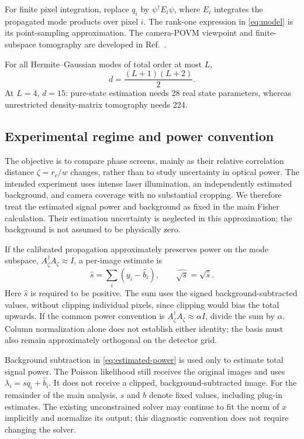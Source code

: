 \documentclass[11pt,a4paper]{article}
\begin{document}
For finite pixel integration, replace $q_i$ by
$\psi^\dagger E_i\psi$, where $E_i$ integrates the propagated mode products
over pixel $i$. The rank-one expression in \eqref{eq:model} is its
point-sampling approximation. The camera-POVM viewpoint and finite-subspace
tomography are developed in Ref.~\cite{oliveira2025}.

For all Hermite--Gaussian modes of total order at most $L$,
\begin{equation}
 d=\frac{(L+1)(L+2)}{2}.
\end{equation}
At $L=4$, $d=15$: pure-state estimation needs 28 real state parameters,
whereas unrestricted density-matrix tomography needs 224.

\subsection{Experimental regime and power convention}
The objective is to compare phase screens, mainly as their relative correlation distance
$\zeta=r_c/w$ changes, rather than to study uncertainty in optical power.
The intended experiment uses intense laser illumination, an independently
estimated background, and camera coverage with no substantial cropping.
We therefore treat the estimated signal power and background as fixed in
the main Fisher calculation. Their estimation uncertainty is neglected in
this approximation; the background is not assumed to be physically zero.

If the calibrated propagation approximately preserves power on the mode
subspace, $A_\zeta^\dagger A_\zeta\approx I$, a per-image estimate is
\begin{equation}
 \widehat s=\sum_i(y_i-\widehat b_i),\qquad
 \widehat{\sqrt{s}}=\sqrt{\widehat s}.
 \label{eq:estimated-power}
\end{equation}
Here $\widehat s$ is required to be positive. The sum uses the signed
background-subtracted values, without clipping individual pixels, since
clipping would bias the total upwards. If the common power convention is
$A_\zeta^\dagger A_\zeta\approx\alpha I$, divide the sum by $\alpha$.
Column normalization alone does not establish either identity; the basis
must also remain approximately orthogonal on the detector grid.

Background subtraction in \eqref{eq:estimated-power} is used only to
estimate total signal power. The Poisson likelihood still receives the
original images and uses $\lambda_i=sq_i+\widehat b_i$. It does not receive
a clipped, background-subtracted image. For the remainder of the main
analysis, $s$ and $b$ denote fixed values, including plug-in estimates.
The existing unconstrained solver may continue to fit the norm of $x$
implicitly and normalize its output; this diagnostic convention does not
require changing the solver.
\end{document}
